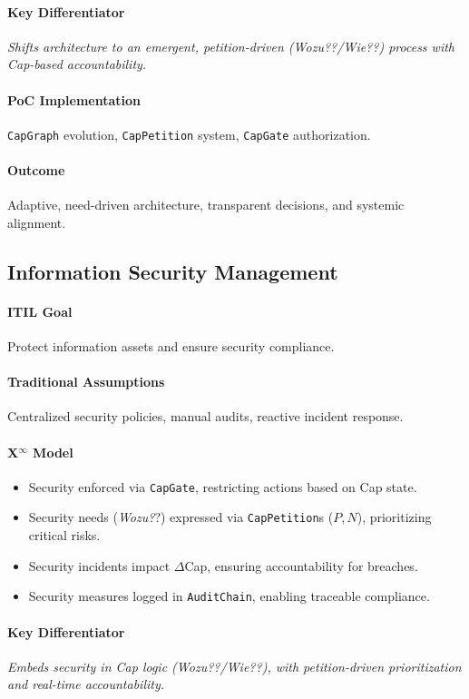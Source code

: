 \documentclass[12pt, a4paper]{scrartcl}
\newcommand{\Xinf}{X$^\infty$}                        %
\newcommand{\DeltaCap}{$\Delta$Cap}                    %
\newcommand{\CapGate}{\texttt{CapGate}}
\newcommand{\AuditChain}{\texttt{AuditChain}}
\newcommand{\CapPetition}{\texttt{CapPetition}}        %
\newcommand{\Wozu}{\textit{Wozu?}}                      %
\newcommand{\Wie}{\textit{Wie?}}                        %
\begin{document}
\paragraph{Key Differentiator} \textit{Shifts architecture to an emergent, petition-driven (\Wozu?/\Wie?) process with Cap-based accountability.}
\paragraph{PoC Implementation} \texttt{CapGraph} evolution, \CapPetition{} system, \CapGate{} authorization.
\paragraph{Outcome} Adaptive, need-driven architecture, transparent decisions, and systemic alignment.

\subsection{Information Security Management} %
\paragraph{ITIL Goal} Protect information assets and ensure security compliance.
\paragraph{Traditional Assumptions} Centralized security policies, manual audits, reactive incident response.
\paragraph*{\Xinf{} Model}
\begin{itemize}
    \item Security enforced via \CapGate{}, restricting actions based on Cap state.
    \item Security needs (\Wozu?) expressed via \CapPetition{}s ($P, N$), prioritizing critical risks.
    \item Security incidents impact \DeltaCap{}, ensuring accountability for breaches.
    \item Security measures logged in \AuditChain{}, enabling traceable compliance.
\end{itemize}
\paragraph{Key Differentiator} \textit{Embeds security in Cap logic (\Wozu?/\Wie?), with petition-driven prioritization and real-time accountability.}
\end{document}
